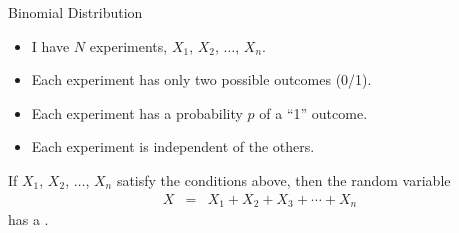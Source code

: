 \begin{frame}{Binomial Distribution}

  \begin{itemize}
  \item I have $N$ experiments, $X_1$, $X_2$, $\ldots$, $X_n$.
  \item Each experiment has only two possible outcomes (0/1).
  \item Each experiment has a probability $p$ of a ``1'' outcome.
  \item Each experiment is independent of the others.
  \end{itemize}

  \vfill

  \begin{definition}
    If $X_1$, $X_2$, $\ldots$, $X_n$ satisfy the conditions above,
    then the random variable
    \begin{eqnarray*}
      X & = & X_1 + X_2 + X_3 + \cdots + X_n
    \end{eqnarray*}
    has a .
  \end{definition}

\end{frame}

